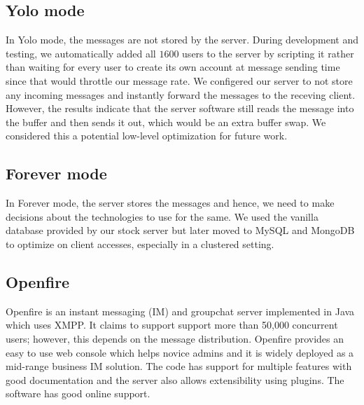 \documentclass[a4paper, twocolumn]{article}
\begin{document}
\subsection{Yolo mode}
In Yolo mode, the messages are not stored by the server. During development and testing, we automatically added all $1600$ users to the server by scripting it rather than waiting for every user to create its own account at message sending time since that would throttle our message rate. We configered our server to not store any incoming messages and instantly forward the messages to the receving client. However, the results indicate that the server software still reads the message into the buffer and then sends it out, which would be an extra buffer swap. We considered this a potential low-level optimization for future work.  

\subsection{Forever mode}
In Forever mode, the server stores the messages and hence, we need to make decisions about the technologies to use for the same. We used the vanilla database provided by our stock server but later moved to MySQL and MongoDB to optimize on client accesses, especially in a clustered setting. 

\subsection{Openfire}
Openfire is an instant messaging (IM) and groupchat server implemented in Java which uses XMPP. It claims to support support more than 50,000 concurrent users; however, this depends on the message distribution. Openfire provides an easy to use web console which helps novice admins and it is widely deployed as a mid-range business IM solution. The code has support for multiple features with good documentation and the server also allows extensibility using plugins. The software has good online support.  
\end{document}
